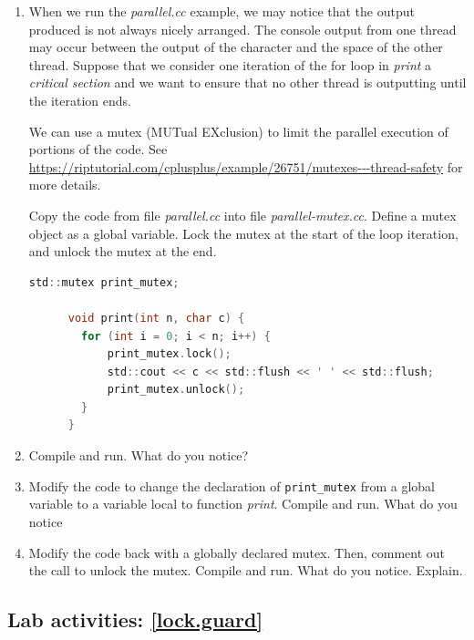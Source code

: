 \documentclass[12pt]{book}
\begin{document}
  \begin{enumerate}[resume*]
  \item When we run the \emph{parallel.cc} example, we may notice that the output produced is not always nicely arranged. The console output from one thread may occur between the output of the character and the space of the other thread. Suppose that we consider one iteration of the for loop in \emph{print} a \emph{critical section} and we want to ensure that no other thread is outputting until the iteration ends.

    We can use a mutex (MUTual EXclusion) to limit the parallel execution of portions of the code. See \url{https://riptutorial.com/cplusplus/example/26751/mutexes---thread-safety} for more details.

    Copy the code from file \emph{parallel.cc} into file \emph{parallel-mutex.cc}. Define a mutex object as a global variable. Lock the mutex at the start of the loop iteration, and unlock the mutex at the end.

    \begin{lstlisting}[language=c]
      std::mutex print_mutex;
     
      void print(int n, char c) {
        for (int i = 0; i < n; i++) {
            print_mutex.lock(); 
            std::cout << c << std::flush << ' ' << std::flush;
            print_mutex.unlock();
        }
      }
    \end{lstlisting}

  \item Compile and run. What do you notice?

  \item Modify the code to change the declaration of \lstinline$print_mutex$ from a global variable to a variable local to function \emph{print}. Compile and run. What do you notice

    \item Modify the code back with a globally declared mutex. Then, comment out the call to unlock the mutex. Compile and run. What do you notice. Explain.
  \end{enumerate}


  \subsection{Lab activities: \ref{lock.guard}}
\end{document}
